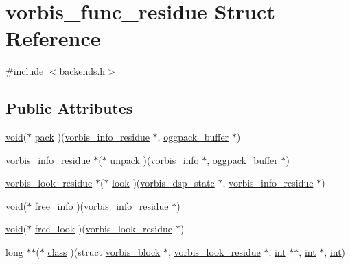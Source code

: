 \hypertarget{structvorbis__func__residue}{}\section{vorbis\+\_\+func\+\_\+residue Struct Reference}
\label{structvorbis__func__residue}


{\ttfamily \#include $<$backends.\+h$>$}

\subsection*{Public Attributes}
\begin{DoxyCompactItemize}
\item 
\hyperlink{sound_8c_ae35f5844602719cf66324f4de2a658b3}{void}($\ast$ \hyperlink{structvorbis__func__residue_a8f24c0275133d9e996c3f63f980cb1c8}{pack} )(\hyperlink{codec__internal_8h_a8b8240a541e288532d710b22512b4524}{vorbis\+\_\+info\+\_\+residue} $\ast$, \hyperlink{structoggpack__buffer}{oggpack\+\_\+buffer} $\ast$)
\item 
\hyperlink{codec__internal_8h_a8b8240a541e288532d710b22512b4524}{vorbis\+\_\+info\+\_\+residue} $\ast$($\ast$ \hyperlink{structvorbis__func__residue_a8c447251801900acf9830763fc05d98e}{unpack} )(\hyperlink{structvorbis__info}{vorbis\+\_\+info} $\ast$, \hyperlink{structoggpack__buffer}{oggpack\+\_\+buffer} $\ast$)
\item 
\hyperlink{codec__internal_8h_a88a17b2922962e44ed846e09a212d0f0}{vorbis\+\_\+look\+\_\+residue} $\ast$($\ast$ \hyperlink{structvorbis__func__residue_a0c5baa9f2dfe51c327d3a1f8f2c5872e}{look} )(\hyperlink{structvorbis__dsp__state}{vorbis\+\_\+dsp\+\_\+state} $\ast$, \hyperlink{codec__internal_8h_a8b8240a541e288532d710b22512b4524}{vorbis\+\_\+info\+\_\+residue} $\ast$)
\item 
\hyperlink{sound_8c_ae35f5844602719cf66324f4de2a658b3}{void}($\ast$ \hyperlink{structvorbis__func__residue_a9feb040bb6f617ad857b413fe0f56744}{free\+\_\+info} )(\hyperlink{codec__internal_8h_a8b8240a541e288532d710b22512b4524}{vorbis\+\_\+info\+\_\+residue} $\ast$)
\item 
\hyperlink{sound_8c_ae35f5844602719cf66324f4de2a658b3}{void}($\ast$ \hyperlink{structvorbis__func__residue_a05f20e87c67f5e2ee5d5342fdaa75dfa}{free\+\_\+look} )(\hyperlink{codec__internal_8h_a88a17b2922962e44ed846e09a212d0f0}{vorbis\+\_\+look\+\_\+residue} $\ast$)
\item 
long $\ast$$\ast$($\ast$ \hyperlink{structvorbis__func__residue_ae9c97420751a9c7062cd2f9b3f9145b9}{class} )(struct \hyperlink{structvorbis__block}{vorbis\+\_\+block} $\ast$, \hyperlink{codec__internal_8h_a88a17b2922962e44ed846e09a212d0f0}{vorbis\+\_\+look\+\_\+residue} $\ast$, \hyperlink{xmltok_8h_a5a0d4a5641ce434f1d23533f2b2e6653}{int} $\ast$$\ast$, \hyperlink{xmltok_8h_a5a0d4a5641ce434f1d23533f2b2e6653}{int} $\ast$, \hyperlink{xmltok_8h_a5a0d4a5641ce434f1d23533f2b2e6653}{int})

\end{DoxyCompactItemize}
